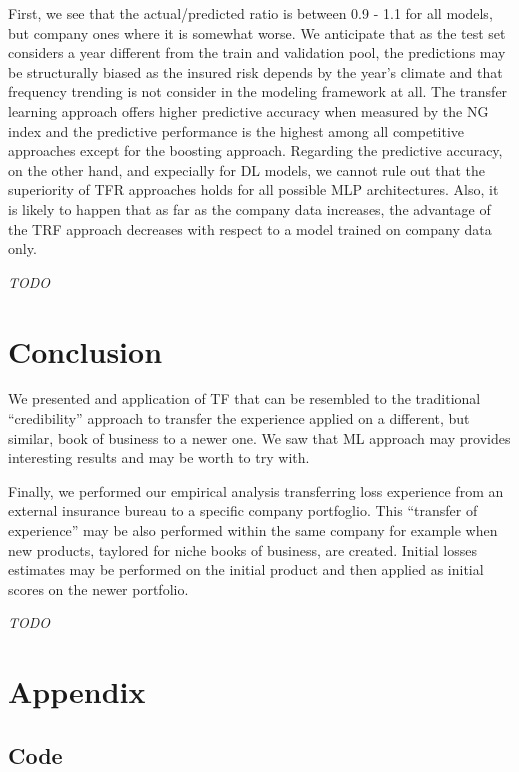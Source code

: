 \documentclass[
]{article}
\begin{document}
First, we see that the actual/predicted ratio is between 0.9 - 1.1 for
all models, but company ones where it is somewhat worse. We anticipate
that as the test set considers a year different from the train and
validation pool, the predictions may be structurally biased as the
insured risk depends by the year's climate and that frequency trending
is not consider in the modeling framework at all. The transfer learning
approach offers higher predictive accuracy when measured by the NG index
and the predictive performance is the highest among all competitive
approaches except for the boosting approach. Regarding the predictive
accuracy, on the other hand, and expecially for DL models, we cannot
rule out that the superiority of TFR approaches holds for all possible
MLP architectures. Also, it is likely to happen that as far as the
company data increases, the advantage of the TRF approach decreases with
respect to a model trained on company data only.

\emph{TODO}

\hypertarget{conclusion}{%
\section{Conclusion}\label{conclusion}}

We presented and application of TF that can be resembled to the
traditional ``credibility'' approach to transfer the experience applied
on a different, but similar, book of business to a newer one. We saw
that ML approach may provides interesting results and may be worth to
try with.

Finally, we performed our empirical analysis transferring loss
experience from an external insurance bureau to a specific company
portfoglio. This ``transfer of experience'' may be also performed within
the same company for example when new products, taylored for niche books
of business, are created. Initial losses estimates may be performed on
the initial product and then applied as initial scores on the newer
portfolio.

\emph{TODO}

\hypertarget{appendix}{%
\section{Appendix}\label{appendix}}

\hypertarget{code}{%
\subsection{Code}\label{code}}
\end{document}
